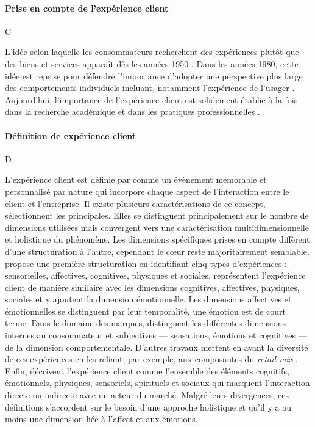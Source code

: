 \documentclass[a4paper,12pt, openany]{book}
\begin{document}
\paragraph{Prise en compte de l'expérience client} C

L'idée selon laquelle les consommateurs recherchent des expériences plutôt que des biens et services apparaît dès les années 1950 \parencites{abbott55, alderson57, levy59, gardner55}. Dans les années 1980, cette idée est reprise pour défendre l'importance d'adopter une perspective plus large des comportements individuels incluant, notamment l'expérience de l'usager \parencites{hirschman82, holbrook82, thompson89, fennell85}. Aujourd'hui, l'importance de l'expérience client est solidement établie à la fois dans la recherche académique et dans les pratiques professionnelles \parencites{balo25, arkadan24, meehan24}. \par

\paragraph{Définition de expérience client} D


L'expérience client est définie par \textcite{pine99} comme un évènement mémorable et personnalisé par nature qui incorpore chaque aspect de l'interaction entre le client et l'entreprise. Il existe plusieurs caractérisations de ce concept, \textcite{lemon16} sélectionnent les principales. Elles se distinguent principalement sur le nombre de dimensions utilisées mais convergent vers une caractérisation multidimensionnelle et holistique du phénomène. Les dimensions spécifiques prises en compte diffèrent d'une structuration à l'autre, cependant le cœur reste majoritairement semblable. \textcite{schmitt99} propose une première structuration en identifiant cinq types d'expériences : sensorielles, affectives, cognitives, physiques et sociales. \textcite{verhoef09} représentent l'expérience client de manière similaire avec les dimensions cognitives, affectives, physiques, sociales et y ajoutent la dimension émotionnelle. Les dimensions affectives et émotionnelles se distinguent par leur temporalité, une émotion est de court terme. Dans le domaine des marques, \textcite{brakus09} distinguent les différentes dimensions internes au consommateur et subjectives — sensations, émotions et cognitives — de la dimension comportementale. D'autres travaux mettent en avant la diversité de ces expériences en les reliant, par exemple, aux composantes du \emph{retail mix} \parencite{grewal09}. Enfin, \textcite{dekeyser15} décrivent l'expérience client comme l'ensemble des éléments cognitifs, émotionnels, physiques, sensoriels, spirituels et sociaux qui marquent l'interaction directe ou indirecte avec un acteur du marché. Malgré leurs divergences, ces définitions s'accordent sur le besoin d'une approche holistique et qu'il y a au moins une dimension liée à l'affect et aux émotions.  \par
\end{document}
